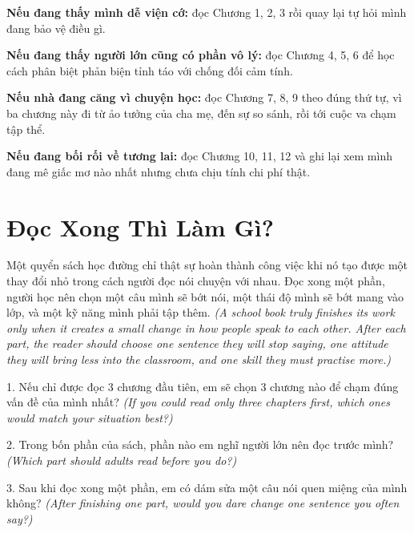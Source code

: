 \begin{tcolorbox}[
  colback=bookbg,
  colframe=bookprimary,
  boxrule=0.8pt,
  arc=4pt,
  title={Lộ Trình Theo Nhu Cầu \quad\textit{(Reading Paths)}},
  fonttitle=\bfseries,
  coltitle=bookprimary,
  breakable,
  enhanced
]
\textbf{Nếu đang thấy mình dễ viện cớ:} đọc Chương 1, 2, 3 rồi quay lại tự hỏi mình đang bảo vệ điều gì.

\textbf{Nếu đang thấy người lớn cũng có phần vô lý:} đọc Chương 4, 5, 6 để học cách phân biệt phản biện tỉnh táo với chống đối cảm tính.

\textbf{Nếu nhà đang căng vì chuyện học:} đọc Chương 7, 8, 9 theo đúng thứ tự, vì ba chương này đi từ ảo tưởng của cha mẹ, đến sự so sánh, rồi tới cuộc va chạm tập thể.

\textbf{Nếu đang bối rối về tương lai:} đọc Chương 10, 11, 12 và ghi lại xem mình đang mê giấc mơ nào nhất nhưng chưa chịu tính chi phí thật.
\end{tcolorbox}

\section*{Đọc Xong Thì Làm Gì?}

\begin{baihoc}
Một quyển sách học đường chỉ thật sự hoàn thành công việc khi nó tạo được một thay đổi nhỏ trong cách người đọc nói chuyện với nhau. Đọc xong một phần, người học nên chọn một câu mình sẽ bớt nói, một thái độ mình sẽ bớt mang vào lớp, và một kỹ năng mình phải tập thêm.
\textit{(A school book truly finishes its work only when it creates a small change in how people speak to each other. After each part, the reader should choose one sentence they will stop saying, one attitude they will bring less into the classroom, and one skill they must practise more.)}
\end{baihoc}

\begin{tuhocnhanh}
1. Nếu chỉ được đọc 3 chương đầu tiên, em sẽ chọn 3 chương nào để chạm đúng vấn đề của mình nhất? \textit{(If you could read only three chapters first, which ones would match your situation best?)}

2. Trong bốn phần của sách, phần nào em nghĩ người lớn nên đọc trước mình? \textit{(Which part should adults read before you do?)}

3. Sau khi đọc xong một phần, em có dám sửa một câu nói quen miệng của mình không? \textit{(After finishing one part, would you dare change one sentence you often say?)}
\end{tuhocnhanh}

\ngancach